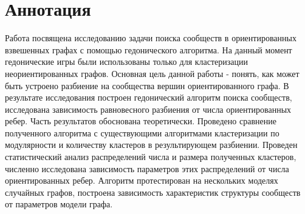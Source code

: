 \chapter{Аннотация}

Работа посвящена исследованию задачи поиска сообществ в ориентированных взвешенных графах с помощью гедонического алгоритма. На данный момент гедонические игры были использованы только для кластеризации неориентированных графов. Основная цель данной работы - понять, как может быть устроено разбиение на сообщества вершин ориентированного графа. В результате исследования построен гедонический алгоритм поиска сообществ, исследована зависимость равновесного разбиения от числа ориентированных ребер. Часть результатов обоснована теоретически. Проведено сравнение полученного алгоритма с существующими алгоритмами кластеризации по модулярности и количеству кластеров в результирующем разбиении. Проведен статистический анализ распределений числа и размера полученных кластеров, численно исследована зависимость параметров этих распределений от числа ориентированных ребер. Алгоритм протестирован на нескольких моделях случайных графов, построена зависимость характеристик структуры сообществ от параметров модели графа.